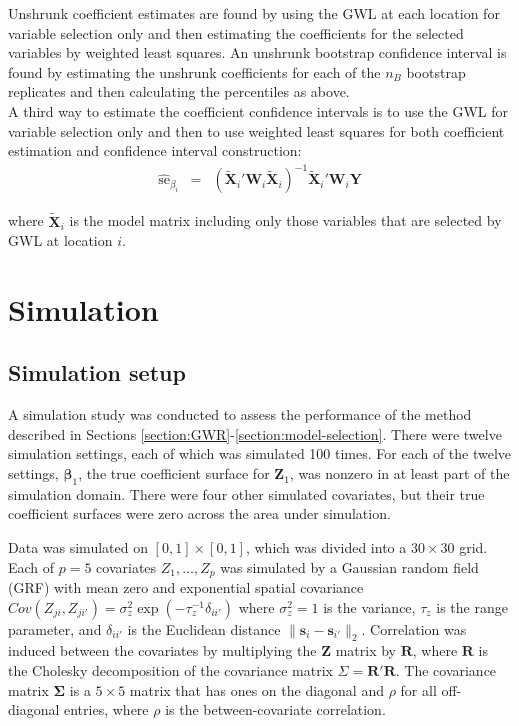 \documentclass[authoryear, review, 11pt]{elsarticle}
\begin{document}
		 Unshrunk coefficient estimates are found by using the GWL at each location for variable selection only and then estimating the coefficients for the selected variables by weighted least squares. An unshrunk bootstrap confidence interval is found by estimating the unshrunk coefficients for each of the $n_B$ bootstrap replicates and then calculating the percentiles as above.\\
		 
		A third way to estimate the coefficient confidence intervals is to use the GWL for variable selection only and then to use weighted least squares for both coefficient estimation and confidence interval construction:
		\begin{eqnarray}
			\hat{\mbox{se}}_{\beta_i} &=& \left( \tilde{\bm{X}}_i'\bm{W}_i \tilde{\bm{X}}_i \right)^{-1}  \tilde{\bm{X}}_i'\bm{W}_i\bm{Y}
		\end{eqnarray}
	
		where $\tilde{\bm{X}}_i$ is the model matrix including only those variables that are selected by GWL at location $i$.



\section{Simulation \label{sec:simulation}}
	\subsection{Simulation setup}
	A simulation study was conducted to assess the performance of the method described in Sections \ref{section:GWR}-\ref{section:model-selection}. There were twelve simulation settings, each of which was simulated 100 times. For each of the twelve settings, $\bm{\beta}_1$, the true coefficient surface for $\bm{Z}_1$, was nonzero in at least part of the simulation domain. There were four other simulated covariates, but their true coefficient surfaces were zero across the area under simulation.
	
	Data was simulated on $[0,1] \times [0,1]$, which was divided into a $30 \times 30$ grid. Each of $p=5$ covariates $Z_1, \dots, Z_p$ was simulated by a Gaussian random field (GRF) with mean zero and exponential spatial covariance $Cov \left(Z_{ji}, Z_{ji'} \right) = \sigma_z^2 \exp{\left( -\tau_z^{-1} \delta_{ii'} \right)}$ where $\sigma_z^2=1$ is the variance, $\tau_z$ is the range parameter, and $\delta_{ii'}$ is the Euclidean distance $\|\bm{s}_i - \bm{s}_{i'}\|_2$. Correlation was induced between the covariates by multiplying the $\bm{Z}$ matrix by $\bm{R}$, where $\bm{R}$ is the Cholesky decomposition of the covariance matrix $\Sigma = \bm{R}'\bm{R}$. The covariance matrix $\bm{\Sigma}$ is a $5 \times 5$ matrix that has ones on the diagonal and $\rho$ for all off-diagonal entries, where $\rho$ is the between-covariate correlation.
		
\end{document}
